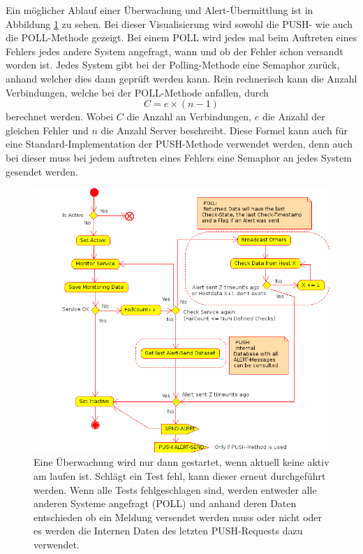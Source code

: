 Ein m\"oglicher Ablauf einer \"Uberwachung und Alert-\"Ubermittlung ist in Abbildung \ref{fig:alert-sample} zu sehen. Bei dieser Visualisierung wird sowohl die PUSH- wie auch die POLL-Methode gezeigt. Bei einem POLL wird jedes mal beim Auftreten eines Fehlers jedes andere System angefragt, wann und ob der Fehler schon versandt worden ist. Jedes System gibt bei der Polling-Methode eine Semaphor zur\"uck, anhand welcher dies dann gepr\"uft werden kann. Rein rechnerisch kann die Anzahl Verbindungen, welche bei der POLL-Methode anfallen, durch
\begin{equation}
C = e \times (n-1)
\label{eq:theorie-alert-last}
\end{equation}
berechnet werden. Wobei $C$ die Anzahl an Verbindungen, $e$ die Anzahl der gleichen Fehler und $n$ die Anzahl Server beschreibt. Diese Formel kann auch f\"ur eine Standard-Implementation der PUSH-Methode verwendet werden, denn auch bei dieser muss bei jedem auftreten eines Fehlers eine Semaphor an jedes System gesendet werden.

\begin{figure}[h]
  \centering
  \includegraphics[width=0.9\linewidth]{images/theorie/AlertSend}
  \caption[Ablauf einer \"Uberwachung und Alarmmeldung]{Eine \"Uberwachung wird nur dann gestartet, wenn aktuell keine aktiv am laufen ist. Schl\"agt ein Test fehl, kann dieser erneut durchgef\"uhrt werden. Wenn alle Tests fehlgeschlagen sind, werden entweder alle anderen Systeme angefragt (POLL) und anhand deren Daten entschieden ob ein Meldung versendet werden muss oder nicht oder es werden die Internen Daten des letzten PUSH-Requests dazu verwendet.}
  \label{fig:alert-sample}
\end{figure}

